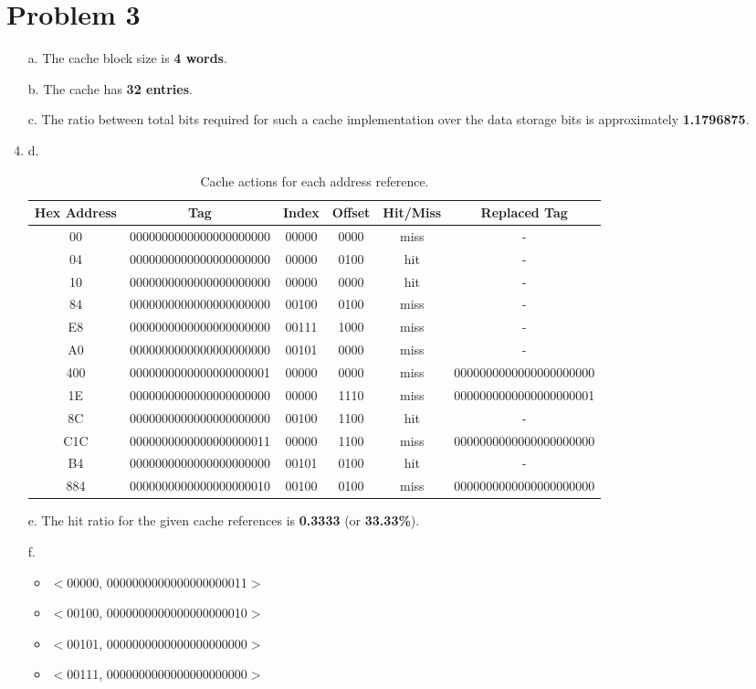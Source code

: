 \documentclass{article}
\begin{document}
\section{Problem 3}
\begin{enumerate}
\item[a.] The cache block size is \textbf{4 words}.
\item[b.] The cache has \textbf{32 entries}.
\item[c.] The ratio between total bits required for such a cache implementation over the data storage bits is approximately \textbf{1.1796875}.

\item{d.}
\begin{table}[h!]
\centering
\begin{tabular}{|c|c|c|c|c|c|}
\hline
Hex Address & Tag & Index & Offset & Hit/Miss & Replaced Tag \\
\hline
00 & 0000000000000000000000 & 00000 & 0000 & miss & - \\
04 & 0000000000000000000000 & 00000 & 0100 & hit & - \\
10 & 0000000000000000000000 & 00000 & 0000 & hit & - \\
84 & 0000000000000000000000 & 00100 & 0100 & miss & - \\
E8 & 0000000000000000000000 & 00111 & 1000 & miss & - \\
A0 & 0000000000000000000000 & 00101 & 0000 & miss & - \\
400 & 0000000000000000000001 & 00000 & 0000 & miss & 0000000000000000000000 \\
1E & 0000000000000000000000 & 00000 & 1110 & miss & 0000000000000000000001 \\
8C & 0000000000000000000000 & 00100 & 1100 & hit & - \\
C1C & 0000000000000000000011 & 00000 & 1100 & miss & 0000000000000000000000 \\
B4 & 0000000000000000000000 & 00101 & 0100 & hit & - \\
884 & 0000000000000000000010 & 00100 & 0100 & miss & 0000000000000000000000 \\
\hline
\end{tabular}
\caption{Cache actions for each address reference.}
\end{table}

\item[e.] The hit ratio for the given cache references is \textbf{0.3333} (or \textbf{33.33\%}).

\item[f.]
\begin{itemize}
    \item $<$00000, 0000000000000000000011$>$
    \item $<$00100, 0000000000000000000010$>$
    \item $<$00101, 0000000000000000000000$>$
    \item $<$00111, 0000000000000000000000$>$
\end{itemize}
\end{enumerate}
\end{document}
